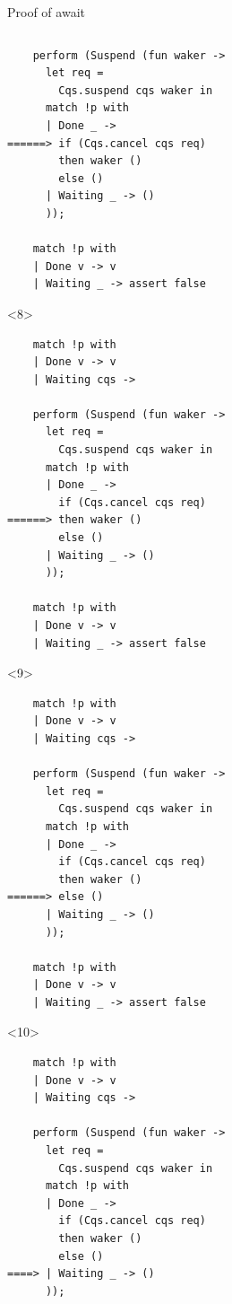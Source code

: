 \documentclass[aspectratio=43]{beamer}
\begin{document}
\begin{frame}[fragile,t]{Proof of await}
\begin{columns}
\begin{column}[T]{0.49\textwidth}
\begin{onlyenv}
\begin{verbatim}
    perform (Suspend (fun waker ->
      let req = 
        Cqs.suspend cqs waker in
      match !p with
      | Done _ -> 
======> if (Cqs.cancel cqs req)
        then waker ()
        else ()
      | Waiting _ -> ()
      ));
    
    match !p with
    | Done v -> v
    | Waiting _ -> assert false
        \end{verbatim}
            \end{onlyenv}

            \begin{onlyenv}<8>
                \begin{verbatim}
    match !p with
    | Done v -> v
    | Waiting cqs ->
    
    perform (Suspend (fun waker ->
      let req = 
        Cqs.suspend cqs waker in
      match !p with
      | Done _ -> 
        if (Cqs.cancel cqs req)
======> then waker ()
        else ()
      | Waiting _ -> ()
      ));
    
    match !p with
    | Done v -> v
    | Waiting _ -> assert false
        \end{verbatim}
            \end{onlyenv}

            \begin{onlyenv}<9>
                \begin{verbatim}
    match !p with
    | Done v -> v
    | Waiting cqs ->
    
    perform (Suspend (fun waker ->
      let req = 
        Cqs.suspend cqs waker in
      match !p with
      | Done _ -> 
        if (Cqs.cancel cqs req)
        then waker ()
======> else ()
      | Waiting _ -> ()
      ));
    
    match !p with
    | Done v -> v
    | Waiting _ -> assert false
        \end{verbatim}
            \end{onlyenv}

            \begin{onlyenv}<10>
                \begin{verbatim}
    match !p with
    | Done v -> v
    | Waiting cqs ->
    
    perform (Suspend (fun waker ->
      let req = 
        Cqs.suspend cqs waker in
      match !p with
      | Done _ -> 
        if (Cqs.cancel cqs req)
        then waker ()
        else ()
====> | Waiting _ -> ()
      ));
    

\end{verbatim}
\end{onlyenv}
\end{column}
\end{columns}
\end{frame}
\end{document}
